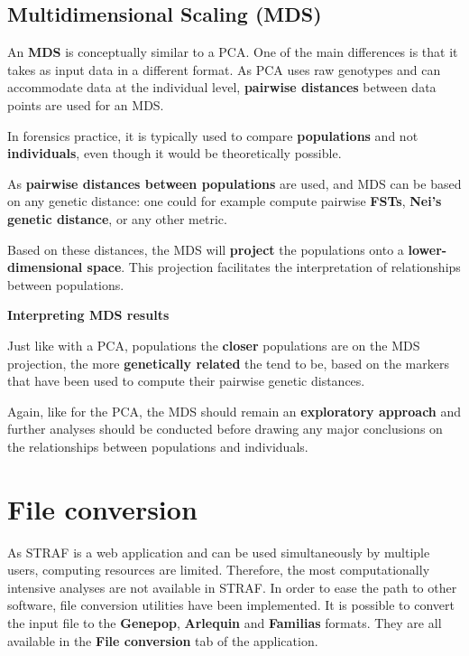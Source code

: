 \documentclass[
]{book}
\begin{document}
\hypertarget{multidimensional-scaling-mds}{%
\section{Multidimensional Scaling (MDS)}\label{multidimensional-scaling-mds}}

An \textbf{MDS} is conceptually similar to a PCA. One of the main differences is
that it takes as input data in a different format. As PCA uses raw genotypes and
can accommodate data at the individual level, \textbf{pairwise distances} between data
points are used for an MDS.

In forensics practice, it is typically used to compare \textbf{populations} and not
\textbf{individuals}, even though it would be theoretically possible.

As \textbf{pairwise distances between populations} are used, and MDS can be based on
any genetic distance: one could for example compute pairwise \textbf{FSTs},
\textbf{Nei's genetic distance}, or any other metric.

Based on these distances, the MDS will \textbf{project} the populations onto a
\textbf{lower-dimensional space}. This projection facilitates the interpretation of
relationships between populations.

\begin{interpretation}
\textbf{Interpreting MDS results}

Just like with a PCA, populations the \textbf{closer} populations are on the MDS projection,
the more \textbf{genetically related} the tend to be, based on the markers that have been
used to compute their pairwise genetic distances.

Again, like for the PCA, the MDS should remain an
\textbf{exploratory approach} and further analyses should be conducted before drawing
any major conclusions on the relationships between populations and individuals.

\end{interpretation}

\hypertarget{file-conversion}{%
\chapter{File conversion}\label{file-conversion}}

As STRAF is a web application and can be used simultaneously by multiple users,
computing resources are limited. Therefore, the most computationally intensive analyses
are not available in STRAF. In order to ease the path to other software,
file conversion utilities have been implemented. It is possible to convert
the input file to the \textbf{Genepop}, \textbf{Arlequin} and \textbf{Familias} formats. They are
all available in the \textbf{File conversion} tab of the application.
\end{document}
